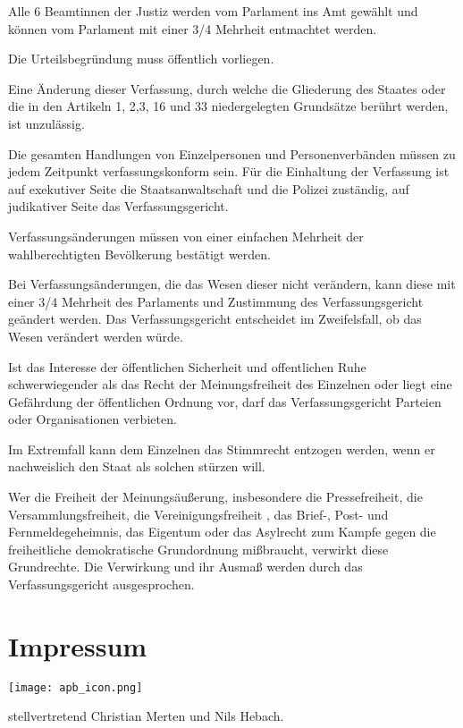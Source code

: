 \documentclass{sasbase}
\begin{document}
\begin{article}
	\item Alle 6 Beamtinnen der Justiz werden vom Parlament ins Amt gewählt und können vom Parlament mit einer 3/4 Mehrheit entmachtet werden.
	\item Die Urteilsbegründung muss öffentlich vorliegen.
\end{article}


\begin{article}[Ewigkeitsklausel]
	\item Eine Änderung dieser Verfassung, durch welche die Gliederung des Staates oder die in den Artikeln 1, 2,3, 16 und 33 niedergelegten Grundsätze berührt werden, ist unzulässig.
\end{article}

\begin{article}
	\item Die gesamten Handlungen von Einzelpersonen und Personenverbänden müssen zu jedem Zeitpunkt verfassungskonform sein. Für die Einhaltung der Verfassung ist auf exekutiver Seite die Staatsanwaltschaft und die Polizei zuständig, auf judikativer Seite das Verfassungsgericht.
	\item Verfassungsänderungen müssen von einer einfachen Mehrheit der wahlberechtigten Bevölkerung bestätigt werden.
	\item Bei Verfassungsänderungen, die das Wesen dieser nicht verändern, kann diese mit einer 3/4 Mehrheit des Parlaments und Zustimmung des Verfassungsgericht geändert werden. Das Verfassungsgericht entscheidet im Zweifelsfall, ob das Wesen verändert werden würde.
\end{article}

\begin{article}
	\item Ist das Interesse der öffentlichen Sicherheit und offentlichen Ruhe schwerwiegender als das Recht der Meinungsfreiheit des Einzelnen oder liegt eine Gefährdung der öffentlichen Ordnung vor, darf das Verfassungsgericht Parteien oder Organisationen verbieten.
	\item Im Extremfall kann dem Einzelnen das Stimmrecht entzogen werden, wenn er nachweislich den Staat als solchen stürzen will.
	\item Wer die Freiheit der Meinungsäußerung, insbesondere die Pressefreiheit, die Versammlungsfreiheit, die Vereinigungsfreiheit , das Brief-, Post- und Fernmeldegeheimnis, das Eigentum oder das Asylrecht zum Kampfe gegen die freiheitliche demokratische Grundordnung mißbraucht, verwirkt diese Grundrechte. Die Verwirkung und ihr Ausmaß werden durch das Verfassungsgericht ausgesprochen.
\end{article}
\newpage

\section{Impressum}
\begin{minipage}{0.4\linewidth}
\texttt{[image: apb\_icon.png]}
\end{minipage}
\begin{minipage}{0.5\linewidth}
{\raggedright stellvertretend Christian Merten und Nils Hebach.}
\end{minipage}
\end{document}
